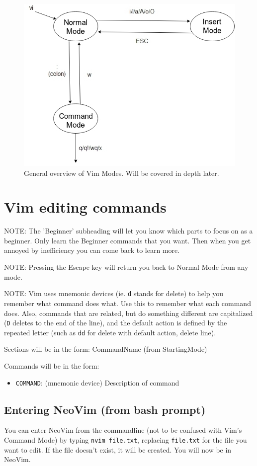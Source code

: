 \documentclass[11pt]{article}
\begin{document}
\begin{figure}[htbp]
\centering
\includegraphics[width=.9\linewidth]{./modes.jpg}
\caption{\label{fig:org62ee4f3}
General overview of Vim Modes. Will be covered in depth later.}
\end{figure}
\section{Vim editing commands}
\label{sec:org404bcb9}
NOTE: The 'Beginner' subheading will let you know which parts to focus on as a
beginner. Only learn the Beginner commands that you want. Then when you get
annoyed by inefficiency you can come back to learn more.

NOTE: Pressing the Escape key will return you back to Normal Mode from any mode.

NOTE: Vim uses mnemonic devices (ie. \texttt{d} stands for delete) to help you remember
what command does what. Use this to remember what each command does. Also,
commands that are related, but do something different are capitalized (\texttt{D}
deletes to the end of the line), and the default action is defined by the
repeated letter (such as \texttt{dd} for delete with default action, delete line).

Sections will be in the form: CommandName (from StartingMode)

Commands will be in the form:
\begin{itemize}
\item \texttt{COMMAND}: (mnemonic device) Description of command
\end{itemize}
\subsection{Entering NeoVim (from bash prompt)}
\label{sec:org010df6a}
You can enter NeoVim from the commandline (not to be confused with Vim's Command
Mode) by typing \texttt{nvim file.txt}, replacing \texttt{file.txt} for the file you want to
edit. If the file doesn't exist, it will be created. You will now be in NeoVim.
\end{document}
